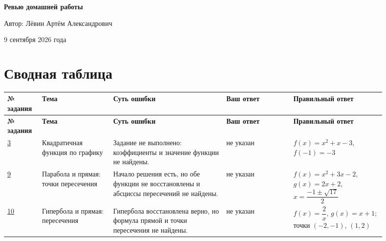 \documentclass[12pt,a4paper]{article}
\begin{document}
\begin{titlepage}
  \thispagestyle{empty}
  \begin{center}
    \vspace*{0.18\textheight}
    {\Huge\bfseries Ревью домашней работы\par}
    \vspace{2.2cm}
    {\Large Автор: Лёвин Артём Александрович\par}
    \vspace{0.8cm}
    {\large 9 сентября 2026 года\par}
    \vfill
  \end{center}
\end{titlepage}

\section*{Сводная таблица}
\small
\setlength{\tabcolsep}{3pt}
\begin{longtable}{@{}p{0.08\linewidth}p{0.17\linewidth}p{0.27\linewidth}p{0.16\linewidth}p{0.22\linewidth}@{}}
\toprule
\textbf{№ задания} & \textbf{Тема} & \textbf{Суть ошибки} & \textbf{Ваш ответ} & \textbf{Правильный ответ} \\
\midrule
\endfirsthead
\toprule
\textbf{№ задания} & \textbf{Тема} & \textbf{Суть ошибки} & \textbf{Ваш ответ} & \textbf{Правильный ответ} \\
\midrule
\endhead
\hyperref[task:3]{3} & Квадратичная функция по графику & Задание не выполнено: коэффициенты и значение функции не найдены. & не указан & \(f(x)=x^2+x-3\), \(f(-1)=-3\) \\
\addlinespace
\hyperref[task:9]{9} & Парабола и прямая: точки пересечения & Начало решения есть, но обе функции не восстановлены и абсциссы пересечений не найдены. & не указан & \(f(x)=x^2+3x-2\), \(g(x)=2x+2\), \(x=\dfrac{-1\pm\sqrt{17}}{2}\) \\
\addlinespace
\hyperref[task:10]{10} & Гипербола и прямая: пересечения & Гипербола восстановлена верно, но формула прямой и точки пересечения не найдены. & не указан & \(f(x)=\dfrac{2}{x}\), \(g(x)=x+1\); точки \((-2,-1)\), \((1,2)\) \\
\bottomrule
\end{longtable}
\normalsize
\setlength{\tabcolsep}{6pt}
\end{document}
